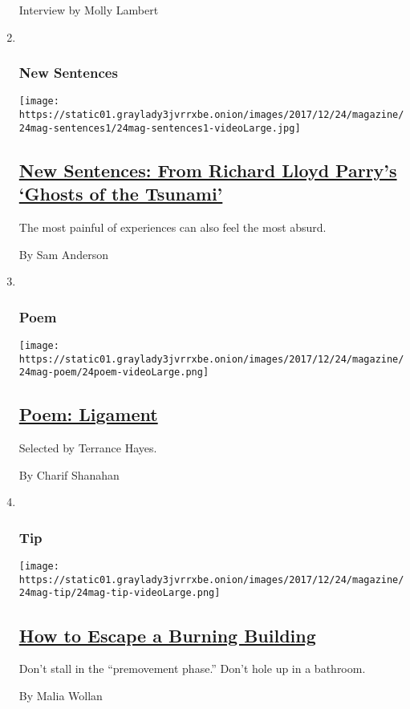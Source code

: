 \begin{enumerate}
  Interview by Molly Lambert
\item ~
  \hypertarget{new-sentences}{%
  \subsubsection{New Sentences}\label{new-sentences}}

  \texttt{[image: https://static01.graylady3jvrrxbe.onion/images/2017/12/24/magazine/24mag-sentences1/24mag-sentences1-videoLarge.jpg]}

  \hypertarget{new-sentences-from-richard-lloyd-parrys-ghosts-of-the-tsunami}{%
  \subsection{\texorpdfstring{\href{/2017/12/22/magazine/new-sentences-from-richard-lloyd-parrys-ghosts-of-the-tsunami.html}{New
  Sentences: From Richard Lloyd Parry's `Ghosts of the
  Tsunami'}}{New Sentences: From Richard Lloyd Parry's `Ghosts of the Tsunami'}}\label{new-sentences-from-richard-lloyd-parrys-ghosts-of-the-tsunami}}

  The most painful of experiences can also feel the most absurd.

  By Sam Anderson
\item ~
  \hypertarget{poem}{%
  \subsubsection{Poem}\label{poem}}

  \texttt{[image: https://static01.graylady3jvrrxbe.onion/images/2017/12/24/magazine/24mag-poem/24poem-videoLarge.png]}

  \hypertarget{poem-ligament}{%
  \subsection{\texorpdfstring{\href{/2017/12/22/magazine/poem-ligament.html}{Poem:
  Ligament}}{Poem: Ligament}}\label{poem-ligament}}

  Selected by Terrance Hayes.

  By Charif Shanahan
\item ~
  \hypertarget{tip}{%
  \subsubsection{Tip}\label{tip}}

  \texttt{[image: https://static01.graylady3jvrrxbe.onion/images/2017/12/24/magazine/24mag-tip/24mag-tip-videoLarge.png]}

  \hypertarget{how-to-escape-a-burning-building}{%
  \subsection{\texorpdfstring{\href{/2017/12/22/magazine/how-to-escape-a-burning-building.html}{How
  to Escape a Burning
  Building}}{How to Escape a Burning Building}}\label{how-to-escape-a-burning-building}}

  Don't stall in the ``premovement phase.'' Don't hole up in a bathroom.

  By Malia Wollan
\end{enumerate}

